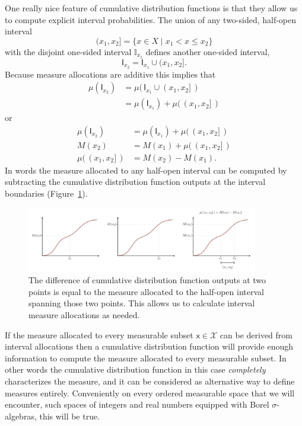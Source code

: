 \documentclass[
  letterpaper,
  DIV=11,
  numbers=noendperiod]{scrartcl}
\begin{document}
One really nice feature of cumulative distribution functions is that
they allow us to compute explicit interval probabilities. The union of
any two-sided, half-open interval \[
( x_{1}, x_{2} ] = \{ x \in X \mid x_{1} < x \le x_{2} \}
\] with the disjoint one-sided interval \(\mathbb{I}_{x_{1}}\) defines
another one-sided interval, \[
\mathsf{I}_{x_{2}} = \mathsf{I}_{x_{1}} \cup (x_{1}, x_{2}].
\] Because measure allocations are additive this implies that
\begin{align*}
\mu(\mathsf{I}_{x_{2}})
&= \mu( \, \mathsf{I}_{x_{1}} \cup (x_{1}, x_{2}] \, )
\\
&= \mu(\mathsf{I}_{x_{1}}) + \mu( \, (x_{1}, x_{2}] \, )
\end{align*} or \begin{align*}
\mu(\mathsf{I}_{x_{2}})
&=
\mu(\mathsf{I}_{x_{1}}) + \mu( \, (x_{1}, x_{2}] \, )
\\
M(x_{2})
&=
M(x_{1}) + \mu( \, (x_{1}, x_{2}] \, )
\\
\mu( \, (x_{1}, x_{2}] \, )
&
= M(x_{2})  - M(x_{1}).
\end{align*} In words the measure allocated to any half-open interval
can be computed by subtracting the cumulative distribution function
outputs at the interval boundaries (Figure~\ref{fig-cdf-probs}).

\begin{figure}

{\centering \includegraphics[width=0.9\textwidth,height=\textheight]{figures/cdfs/cdf_probs/cdf_probs.pdf}

}

\caption{\label{fig-cdf-probs}The difference of cumulative distribution
function outputs at two points is equal to the measure allocated to the
half-open interval spanning those two points. This allows us to
calculate interval measure allocations as needed.}

\end{figure}

If the measure allocated to every measurable subset
\(\mathsf{x} \in \mathcal{X}\) can be derived from interval allocations
then a cumulative distribution function will provide enough information
to compute the measure allocated to every measurable subset. In other
words the cumulative distribution function in this case
\emph{completely} characterizes the measure, and it can be considered as
alternative way to define measures entirely. Conveniently on every
ordered measurable space that we will encounter, such spaces of integers
and real numbers equipped with Borel \(\sigma\)-algebras, this will be
true.
\end{document}
